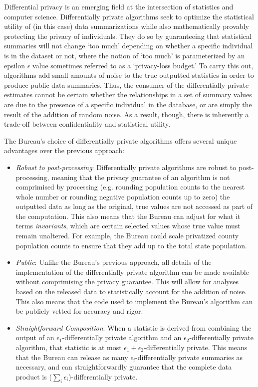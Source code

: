 Differential privacy is an emerging field at the intersection of statistics and computer science. Differentially private algorithms seek to optimize the statistical utility of (in this case) data summarizations while also mathematically provably protecting the privacy of individuals. They do so by guaranteeing that statistical summaries will not change `too much' depending on whether a specific individual is in the dataset or not, where the notion of `too much' is parameterized by an epsilon $\epsilon$ value sometimes referred to as a `privacy-loss budget.' To carry this out, algorithms add small amounts of noise to the true outputted statistics in order to produce public data summaries. Thus, the consumer of the differentially private estimates cannot be certain whether the relationships in a set of summary values are due to the presence of a specific individual in the database, or are simply the result of the addition of random noise. As a result, though, there is inherently a trade-off between confidentiality and statistical utility.

The Bureau's choice of differentially private algorithms offers several unique advantages over the previous approach:

\begin{itemize}
  \item \textit{Robust to post-processing}: Differentially private algorithms are robust to post-processing, meaning that the privacy guarantee of an algorithm is not comprimised by processing (e.g. rounding population counts to the nearest whole number or rounding negative population counts up to zero) the outputted data as long as the original, true values are not accessed as part of the computation. This also means that the Bureau can adjust for what it terms \textit{invariants}, which are certain selected values whose true value must remain unaltered. For example, the Bureau could scale privatized county population counts to ensure that they add up to the total state population.
  \item \textit{Public}: Unlike the Bureau's previous approach, all details of the implementation of the differentially private algorithm can be made available without comprimising the privacy guarantee. This will allow for analyses based on the released data to statistically account for the addition of noise. This also means that the code used to implement the Bureau's algorithm can be publicly vetted for accuracy and rigor.
  \item \textit{Straightforward Composition}: When a statistic is derived from combining the output of an $\epsilon_1$-differentially private algorithm and an $\epsilon_2$-differentially private algorithm, that statistic is at most $\epsilon_1 + \epsilon_2$-differentially private. This means that the Bureau can release as many $\epsilon_i$-differentially private summaries as necessary, and can straightforwardly guarantee that the complete data product is ($\sum_i \epsilon_i$)-differentially private.
\end{itemize}

